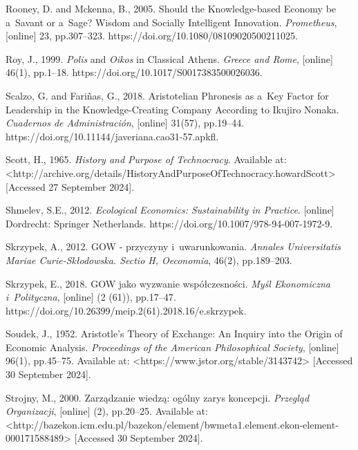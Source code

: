 Rooney, D. and Mckenna, B., 2005. Should the Knowledge-based Economy be a~Savant or a~Sage? Wisdom and Socially Intelligent Innovation. \textit{Prometheus}, [online] 23, pp.307–323. https://doi.org/10.1080/08109020500211025.



Roy, J., 1999. \textit{Polis} and \textit{Oikos} in Classical Athens. \textit{Greece and Rome}, [online] 46(1), pp.1–18. https://doi.org/10.1017/S0017383500026036.



Scalzo, G. and Fariñas, G., 2018. Aristotelian Phronesis as a~Key Factor for Leadership in the Knowledge-Creating Company According to Ikujiro Nonaka. \textit{Cuadernos de Administración}, [online] 31(57), pp.19–44. https://doi.org/10.11144/javeriana.cao31-57.apkfl.



Scott, H., 1965. \textit{History and Purpose of Technocracy}. Available at: {\textless}http://archive.org/details/HistoryAndPurposeOfTechnocracy.howardScott{\textgreater} [Accessed 27 September 2024].



Shmelev, S.E., 2012. \textit{Ecological Economics: Sustainability in Practice}. [online] Dordrecht: Springer Netherlands. https://doi.org/10.1007/978-94-007-1972-9.



Skrzypek, A., 2012. GOW - przyczyny i~uwarunkowania. \textit{Annales Universitatis Mariae Curie-Skłodowska. Sectio H, Oeconomia}, 46(2), pp.189–203.



Skrzypek, E., 2018. GOW jako wyzwanie współczesności. \textit{Myśl Ekonomiczna i~Polityczna}, [online] (2 (61)), pp.17–47. https://doi.org/10.26399/meip.2(61).2018.16/e.skrzypek.



Soudek, J., 1952. Aristotle's Theory of Exchange: An Inquiry into the Origin of Economic Analysis. \textit{Proceedings of the American Philosophical Society}, [online] 96(1), pp.45–75. Available at: {\textless}https://www.jstor.org/stable/3143742{\textgreater} [Accessed 30 September 2024].



Strojny, M., 2000. Zarządzanie wiedzą: ogólny zarys koncepcji. \textit{Przegląd Organizacji}, [online] (2), pp.20–25. Available at: {\textless}http://bazekon.icm.edu.pl/bazekon/element/bwmeta1.element.ekon-element-000171588489{\textgreater} [Accessed 30 September 2024].



